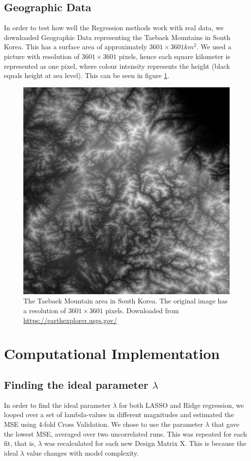 \documentclass[11pt,a4paper,titlepage]{article}
\begin{document}
\subsection{Geographic Data}
In order to test how well the Regression methods work with real data, we downloaded Geographic Data representing the Taebaek Mountains in South Korea. This has a surface area of approximately $3601\times 3601 km^2$. We used a picture with resolution of $3601\times 3601$ pixels, hence each square kilometer is represented as one pixel, where colour intensity represents the height (black equals height at sea level). This can be seen in figure \ref{Korea}.
\begin{figure}[H]
\centering
\includegraphics[trim=1cm 0.2cm 1.5cm 1.2cm, clip=true,scale = 0.05]{../figures/presentable_data/korea.png}
\caption[Taebbaek Mountain]{The Taebaek Mountain area in South Korea. The original image has a resolution of $3601\times 3601$ pixels. Downloaded from \url{https://earthexplorer.usgs.gov/} }\label{Korea}
\end{figure}
\section{Computational Implementation}
\subsection{Finding the ideal parameter $\lambda$}
In order to find the ideal parameter $\lambda$ for both LASSO and Ridge regression, we looped over a set of lambda-values in different magnitudes and estimated the MSE using 4-fold Cross Validation. We chose to use the parameter $\lambda$ that gave the lowest MSE, averaged over two uncorrelated runs. This was repeated for each fit, that is,  $\lambda$ was recalculated for each new Design Matrix X. This is because the ideal $\lambda$ value changes with model complexity.
\end{document}
